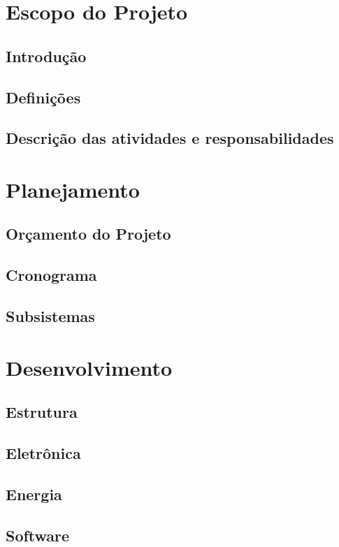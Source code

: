 \part{Escopo do Projeto}

\chapter{Introdução}


\chapter{Definições}


\chapter{Descrição das atividades e responsabilidades}


\openany

\part{Planejamento}

\chapter{Orçamento do Projeto}


\chapter{Cronograma}


\chapter{Subsistemas}


\part{Desenvolvimento}

\chapter{Estrutura}


\chapter{Eletrônica}


\chapter{Energia}


\chapter{Software}
